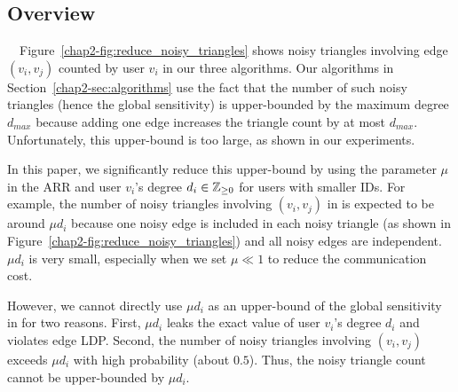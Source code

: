 \subsection{Overview}
\label{chap2-sub:clip_overview}

{}~~Figure~\ref{chap2-fig:reduce_noisy_triangles} shows noisy triangles involving edge $(v_i,v_j)$ counted by user $v_i$ in our three algorithms. 
Our algorithms in Section~\ref{chap2-sec:algorithms} 
use the fact that the number of such noisy triangles (hence the global sensitivity) is upper-bounded by the maximum degree $d_{max}$ because 
adding one edge increases the triangle count by at most $d_{max}$. 
Unfortunately, this upper-bound is too large, as shown in our experiments. 

In this paper, we 
significantly reduce this upper-bound by using the parameter $\mu$ in the ARR and user $v_i$'s degree $d_i \in \mathbb{Z}_{\ge0}$ for users with smaller IDs. 
For example, 
the number of noisy triangles involving $(v_i,v_j)$ in \AlgOne is 
expected to be around 
$\mu d_i$ 
because one noisy edge is included in each noisy triangle (as shown in Figure~\ref{chap2-fig:reduce_noisy_triangles}) and all noisy edges are independent. 
$\mu d_i$ is very small, especially when we set $\mu \ll 1$ to reduce the communication cost.  

However, we cannot directly use $\mu d_i$ as an upper-bound of the global sensitivity in \AlgOne for two reasons. 
First, $\mu d_i$ leaks the exact value of user $v_i$'s degree $d_i$ 
and 
violates edge LDP. 
Second, the number of noisy triangles involving $(v_i,v_j)$ exceeds $\mu d_i$ with high probability (about $0.5$). 
Thus, the noisy triangle count cannot be upper-bounded by $\mu d_i$. 

